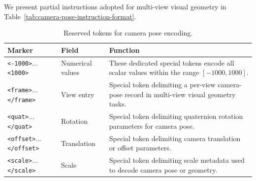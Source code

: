 We present partial instructions adopted for multi-view visual geometry in Table~\ref{tab:camera-pose-instruction-format}.
\begin{table}[htbp]
  \centering
  \footnotesize
  \setlength{\tabcolsep}{3pt}
  \renewcommand{\arraystretch}{0.88}
  \begin{tabular}{p{}|p{}|p{}}
    \toprule
    Marker & Field & Function \\
    \midrule
    \texttt{<-1000>}...\texttt{<1000>} & Numerical values & These dedicated special tokens encode all scalar values within the range $[-1000, 1000]$. \\
    \midrule
    \texttt{<frame>}...\texttt{</frame>} & View entry & Special token delimiting a per-view camera-pose record in multi-view visual geometry tasks. \\
    \midrule
    \texttt{<quat>}...\texttt{</quat>} & Rotation & Special token delimiting quaternion rotation parameters for camera pose. \\
    \midrule
    \texttt{<offset>}...\texttt{</offset>} & Translation & Special token delimiting camera translation or offset parameters. \\
    \midrule
    \texttt{<scale>}...\texttt{</scale>} & Scale & Special token delimiting scale metadata used to decode camera pose or geometry. \\
    \bottomrule
  \end{tabular}
  \caption{Reserved tokens for camera pose encoding.}
  \label{tab:pose_token_markers}
\end{table}

